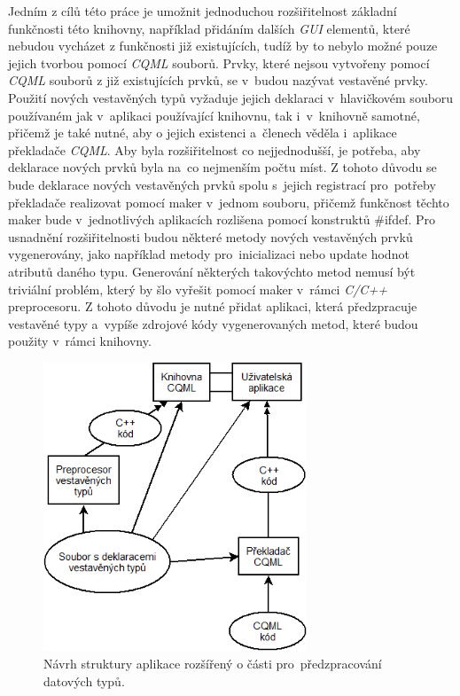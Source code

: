 \documentclass[11pt,twoside,a4paper]{book}
\begin{document}
Jedním z cílů této práce je umožnit jednoduchou rozšiřitelnost základní funkčnosti této knihovny, například přidáním dalších \textit{GUI} elementů, které nebudou vycházet z funkčnosti již existujících, tudíž by to nebylo možné pouze jejich tvorbou pomocí \textit{CQML} souborů. Prvky, které nejsou vytvořeny pomocí \textit{CQML} souborů z již existujících prvků, se v~budou nazývat vestavěné prvky.
Použití nových vestavěných typů vyžaduje jejich deklaraci v~hlavičkovém souboru používaném jak v~aplikaci používající knihovnu, tak i~v~knihovně samotné, přičemž je také nutné, aby o jejich existenci a~členech věděla i~aplikace překladače \textit{CQML}. Aby byla rozšiřitelnost co nejjednodušší, je potřeba, aby deklarace nových prvků byla na~co nejmenším počtu míst. Z tohoto důvodu se bude deklarace nových vestavěných prvků spolu s~jejich registrací pro~potřeby překladače realizovat pomocí maker v~jednom souboru, přičemž funkčnost těchto maker bude v~jednotlivých aplikacích rozlišena pomocí konstruktů \#ifdef.
Pro usnadnění rozšiřitelnosti budou některé metody nových vestavěných prvků vygenerovány, jako například metody pro~inicializaci nebo update hodnot atributů daného typu. Generování některých takovýchto metod nemusí být triviální problém, který by šlo vyřešit pomocí maker v~rámci \textit{C/C++} preprocesoru. Z tohoto důvodu je nutné přidat aplikaci, která předzpracuje vestavěné typy a~vypíše zdrojové kódy vygenerovaných metod, které budou použity v~rámci knihovny.

\begin{figure}[!ht]
\begin{center}
  \includegraphics[width=0.7\textwidth]{Diagram2}
\caption{{\label{fig:structure2}}Návrh struktury aplikace rozšířený o části pro~předzpracování datových typů.}
\end{center}
\end{figure}
\end{document}
